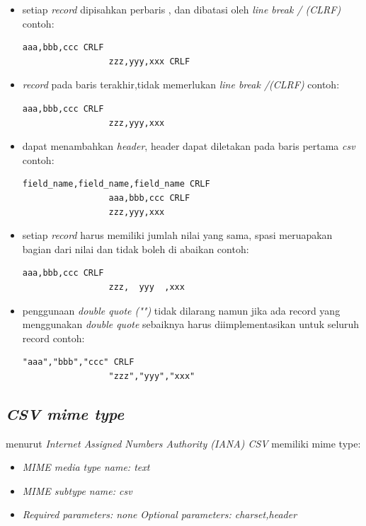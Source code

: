 \begin{itemize}
    \item setiap \textit{record} dipisahkan perbaris , dan dibatasi oleh \textit{line break / (CLRF)} contoh:
            \begin{lstlisting}[]
                 aaa,bbb,ccc CRLF
                 zzz,yyy,xxx CRLF
             \end{lstlisting}
    \item  \textit{record} pada baris terakhir,tidak memerlukan \textit{line break /(CLRF)} contoh:
            \begin{lstlisting}[]
                 aaa,bbb,ccc CRLF
                 zzz,yyy,xxx
             \end{lstlisting}
    \item  dapat menambahkan \textit{header}, header dapat diletakan pada baris pertama \textit{csv} contoh:
            \begin{lstlisting}[]
                 field_name,field_name,field_name CRLF
                 aaa,bbb,ccc CRLF
                 zzz,yyy,xxx
             \end{lstlisting}
    \item  setiap \textit{record} harus memiliki jumlah nilai yang sama, spasi meruapakan bagian dari nilai dan tidak boleh di abaikan contoh:
            \begin{lstlisting}[]
                 aaa,bbb,ccc CRLF
                 zzz,  yyy  ,xxx
             \end{lstlisting}
    \item  penggunaan \textit{double quote ("")} tidak dilarang namun jika ada record yang menggunakan \textit{double quote} sebaiknya harus diimplementasikan untuk seluruh record  contoh:
            \begin{lstlisting}[]
                "aaa","bbb","ccc" CRLF
                 "zzz","yyy","xxx"
             \end{lstlisting}
\end{itemize}

\subsection{\textit{CSV mime type}}
menurut \textit{Internet Assigned Numbers Authority (IANA) CSV } memiliki mime type:
\begin{itemize}
    \item \textit{ MIME media type name: text}
    \item \textit{  MIME subtype name: csv}
    \item \textit{ Required parameters: none}
    \uten \textit{Optional parameters: \textit{charset},\textit{header}}
\end{itemize}

